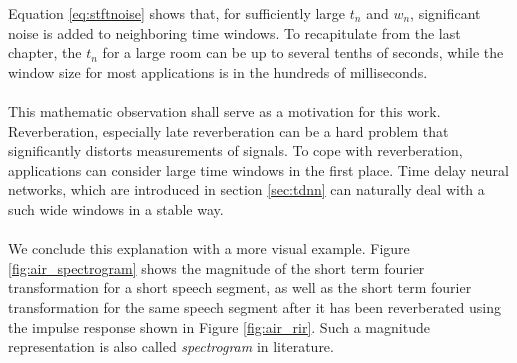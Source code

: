 Equation \ref{eq:stftnoise} shows that, for sufficiently large $t_n$ and $w_n$, significant noise is added to neighboring time windows. To recapitulate from the last chapter, the $t_n$ for a large room can be up to several tenths of seconds, while the window size for most applications is in the hundreds of milliseconds. 
\\ \\
This mathematic observation shall serve as a motivation for this work. Reverberation, especially late reverberation can be a hard problem that significantly distorts measurements of signals. To cope with reverberation, applications can consider large time windows in the first place. Time delay neural networks, which are introduced in section \ref{sec:tdnn} can naturally deal with a such wide windows in a stable way. 
\\ \\
We conclude this explanation with a more visual example. Figure \ref{fig:air_spectrogram} shows the magnitude of the short term fourier transformation for a short speech segment, as well as the short term fourier transformation for the same speech segment after it has been reverberated using the impulse response shown in Figure \ref{fig:air_rir}. Such a magnitude representation is also called \textit{spectrogram} in literature. 


\begin{minipage}{\linewidth}
	\label{fig:air_spectrogram}
\end{minipage}


